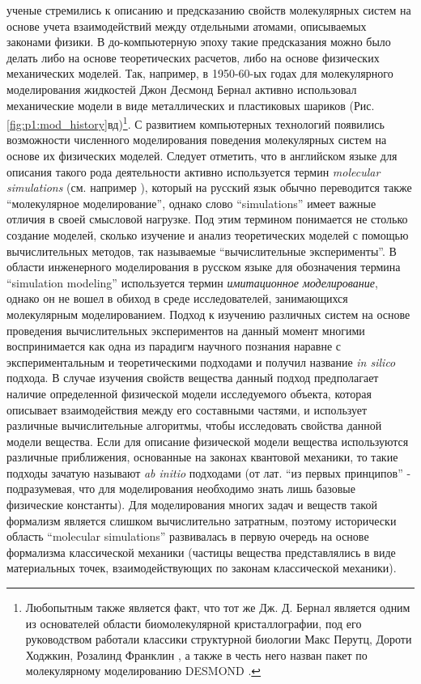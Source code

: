 ученые стремились к описанию и предсказанию свойств молекулярных систем на основе учета взаимодействий между отдельными атомами, описываемых законами физики. В до-компьютерную эпоху такие предсказания можно было делать либо на основе теоретических расчетов, либо на основе физических механических моделей. Так, например, в 1950-60-ых годах для молекулярного моделирования жидкостей Джон Десмонд Бернал активно использовал механические модели в виде металлических и пластиковых шариков \cite{bernal_bakerian_1964}(Рис. \ref{fig:p1:mod_history}вд)\footnote{Любопытным также является факт, что тот же Дж. Д. Бернал является одним из основателей области биомолекулярной кристаллографии, под его руководством работали классики структурной биологии Макс Перутц, Дороти Ходжкин, Розалинд Франклин \cite{breathnach_desmond_1995}, а также в честь него назван пакет по молекулярному моделированию DESMOND \cite{kevin_schrodinger_2020}.}. С развитием компьютерных технологий появились возможности численного моделирования поведения молекулярных систем на основе их физических моделей. Следует отметить, что в английском языке для описания такого рода деятельности активно используется термин \textit{molecular simulations} (см. например \cite{Frenkel}), который на русский язык обычно переводится также ``молекулярное моделирование'', однако слово ``simulations'' имеет важные отличия в своей смысловой нагрузке. Под этим термином понимается не столько создание моделей, сколько изучение и анализ теоретических моделей с помощью вычислительных методов, так называемые ``вычислительные эксперименты''. В области инженерного моделирования в русском языке для обозначения термина ``simulation modeling'' используется термин \textit{имитационное моделирование}, однако он не вошел в обиход в среде исследователей, занимающихся молекулярным моделированием. Подход к изучению различных систем на основе проведения вычислительных экспериментов на данный момент многими воспринимается как одна из парадигм научного познания наравне с экспериментальным и теоретическими подходами \cite{hey_fourth_2009} и получил название \textit{in silico} подхода. В случае изучения свойств вещества данный подход предполагает наличие определенной физической модели исследуемого объекта, которая описывает взаимодействия между его составными частями, и использует различные вычислительные алгоритмы, чтобы исследовать свойства данной модели вещества. Если для описание физической модели вещества используются различные приближения, основанные на законах квантовой механики, то такие подходы зачатую называют \textit{ab initio} подходами (от лат. ``из первых принципов'' - подразумевая, что для моделирования необходимо знать лишь базовые физические константы). Для моделирования многих задач и веществ такой формализм является слишком вычислительно затратным, поэтому исторически область ``molecular simulations'' развивалась в первую очередь на основе формализма классической механики (частицы вещества представлялись в виде материальных точек, взаимодействующих по законам классической механики).

